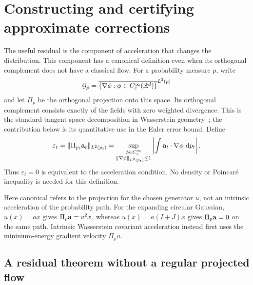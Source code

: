\section{Constructing and certifying approximate corrections}
\label{sec:certification}

The useful residual is the component of acceleration that changes the
distribution.  This component has a canonical definition even when its
orthogonal complement does not have a classical flow.  For a probability
measure $p$, write
\[
 \mathcal G_p=\overline{\{\nabla\phi:\phi\in C_c^\infty(\mathbb R^d)\}}^{L^2(p)}
\]
and let $\Pi_p$ be the orthogonal projection onto this space.
Its orthogonal complement consists exactly
of the fields with zero weighted divergence.  This is the standard tangent
space decomposition in Wasserstein geometry~\citep[Chapter~8]{ambrosio2005gradient};
the contribution below is its quantitative use in the Euler error bound.
Define
\begin{equation}
 \varepsilon_t=\|\Pi_{p_t}\mathbf a_t\|_{L^2(p_t)}
 =\sup_{\substack{\phi\in C_c^\infty\\\|\nabla\phi\|_{L^2(p_t)}\le1}}
       \left|\int\mathbf a_t\cdot\nabla\phi\,\,\mathrm d p_t\right|.
 \label{eq:canonical-residual}
\end{equation}
Thus $\varepsilon_t=0$ is equivalent to the acceleration condition.
No density or Poincar\'e inequality is needed for this definition.

Here canonical refers to the projection for the chosen generator $u$,
not an intrinsic acceleration of the probability path. For the expanding
circular Gaussian, $u(x)=ax$ gives $\Pi_p\mathbf a=a^2x$, whereas
$u(x)=a(I+J)x$ gives $\Pi_p\mathbf a=0$ on the same path. Intrinsic
Wasserstein covariant acceleration instead first uses the minimum-energy
gradient velocity $\Pi_pu$.

\subsection{A residual theorem without a regular projected flow}

